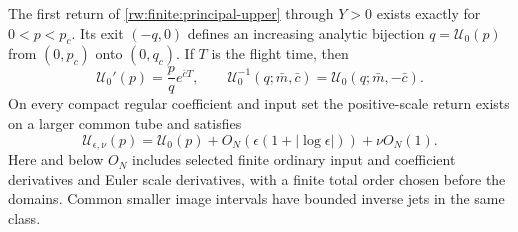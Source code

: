 \begin{lemma}\label{rw:finite:upper-return}
The first return of \eqref{rw:finite:principal-upper} through $Y>0$
exists exactly for $0<p<p_c$. Its exit $(-q,0)$ defines an increasing
analytic bijection $q=\mathcal U_0(p)$ from $(0,p_c)$ onto $(0,q_c)$.
If $T$ is the flight time, then
\begin{equation}\label{rw:finite:upper-derivative}
 \mathcal U_0'(p)=\frac pq e^{\bar cT},\qquad
 \mathcal U_0^{-1}(q;\bar m,\bar c)
       =\mathcal U_0(q;\bar m,-\bar c).
\end{equation}
On every compact regular coefficient and input set the positive-scale
return exists on a larger common tube and satisfies
\begin{equation}\label{rw:finite:regular-upper-error}
 \mathcal U_{\epsilon,\nu}(p)
 =\mathcal U_0(p)+O_N(\epsilon(1+|\log\epsilon|))+\nu O_N(1).
\end{equation}
Here and below $O_N$ includes selected finite ordinary input and
coefficient derivatives and Euler scale derivatives, with a finite
total order chosen before the domains. Common smaller image intervals
have bounded inverse jets in the same class.
\end{lemma}
